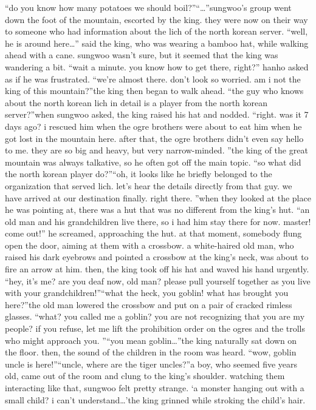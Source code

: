 “do you know how many potatoes we should boil?”“…”sungwoo’s group went down the foot of the mountain, escorted by the king.
 they were now on their way to someone who had information about the lich of the north korean server.
“well, he is around here…” said the king, who was wearing a bamboo hat, while walking ahead with a cane.
sungwoo wasn’t sure, but it seemed that the king was wandering a bit.
“wait a minute.
 you know how to get there, right?” hanho asked as if he was frustrated.
“we’re almost there.
 don’t look so worried.
 am i not the king of this mountain?”the king then began to walk ahead.
“the guy who knows about the north korean lich in detail is a player from the north korean server?”when sungwoo asked, the king raised his hat and nodded.
“right.
 was it 7 days ago? i rescued him when the ogre brothers were about to eat him when he got lost in the mountain here.
 after that, the ogre brothers didn’t even say hello to me.
 they are so big and heavy, but very narrow-minded.
”the king of the great mountain was always talkative, so he often got off the main topic.
“so what did the north korean player do?”“oh, it looks like he briefly belonged to the organization that served lich.
 let’s hear the details directly from that guy.
 we have arrived at our destination finally.
 right there.
”when they looked at the place he was pointing at, there was a hut that was no different from the king’s hut.
“an old man and his grandchildren live there, so i had him stay there for now.
 master! come out!”
he screamed, approaching the hut.
 at that moment, somebody flung open the door, aiming at them with a crossbow.
a white-haired old man, who raised his dark eyebrows and pointed a crossbow at the king’s neck, was about to fire an arrow at him.
 then, the king took off his hat and waved his hand urgently.
“hey, it’s me? are you deaf now, old man? please pull yourself together as you live with your grandchildren!”“what the heck, you goblin! what has brought you here?”the old man lowered the crossbow and put on a pair of cracked rimless glasses.
“what? you called me a goblin? you are not recognizing that you are my people? if you refuse, let me lift the prohibition order on the ogres and the trolls who might approach you.
”“you mean goblin…”the king naturally sat down on the floor.
 then, the sound of the children in the room was heard.
“wow, goblin uncle is here!”“uncle, where are the tiger uncles?”a boy, who seemed five years old, came out of the room and clung to the king’s shoulder.
watching them interacting like that, sungwoo felt pretty strange.
‘a monster hanging out with a small child? i can’t understand…’the king grinned while stroking the child’s hair.
